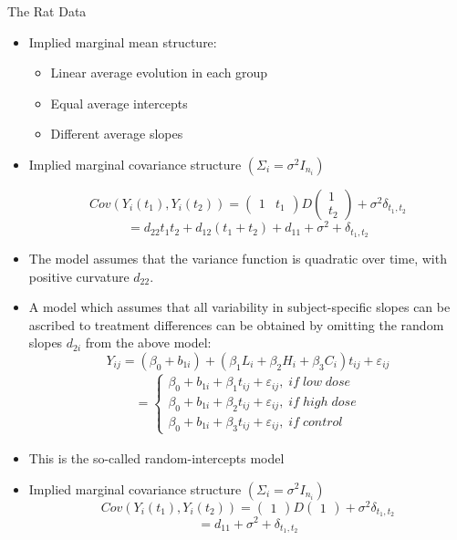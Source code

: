 \documentclass{beamer}
\begin{document}
\begin{frame}{The Rat Data}
\begin{itemize}
\item Implied marginal mean structure:
\begin{itemize}
\item Linear average evolution in each group
\item Equal average intercepts
\item Different average slopes
\end{itemize}
\item Implied marginal covariance structure $(\Sigma_i=\sigma^2I_{n_i})$

\[Cov(Y_i(t_1),Y_i(t_2))=
\begin{pmatrix}
1&t_1
\end{pmatrix}
D
\begin{pmatrix}
1\\
t_2
\end{pmatrix} + \sigma^2\delta_{t_1,t_2}
\]
\[=d_{22}t_1t_2+d_{12}(t_1+t_2)+d_{11}+\sigma^2+\delta_{t_1,t_2}\]
\item The model assumes that the variance function is quadratic over time, with positive curvature $d_{22}$.
\end{itemize}
\end{frame}

\begin{frame}
\begin{itemize}
\item A model which assumes that all variability in subject-specific slopes can be ascribed to treatment differences can be obtained by omitting the random slopes $d_{2i}$ from the above model:
\[
Y_{ij} =(\beta_0+b_{1i})+ (\beta_{1}L_i + \beta_{2}H_i+ \beta_{3}C_i)t_{ij}  + \varepsilon_{ij}\]
\begin{eqnarray*}
=\left\{\begin{array}{l}
\beta_{0} + b_{1i} +\beta_{1}t_{ij}+\varepsilon_{ij}, \;if \;low \;dose\\
\beta_{0} + b_{1i} +\beta_{2}t_{ij}+\varepsilon_{ij}, \;if \;high \;dose\\
\beta_{0} + b_{1i} +\beta_{3}t_{ij}+\varepsilon_{ij}, \;if \;control
\end{array}\right.
\end{eqnarray*}
\item This is the so-called random-intercepts model
\item Implied marginal covariance structure $(\Sigma_i=\sigma^2I_{n_i})$
\[Cov(Y_i(t_1),Y_i(t_2))=\begin{pmatrix}
1
\end{pmatrix}
D
\begin{pmatrix}
1
\end{pmatrix} + \sigma^2\delta_{t_1,t_2}
\]
\[=d_{11}+\sigma^2+\delta_{t_1,t_2}\]
\end{itemize}
\end{frame}
\end{document}
